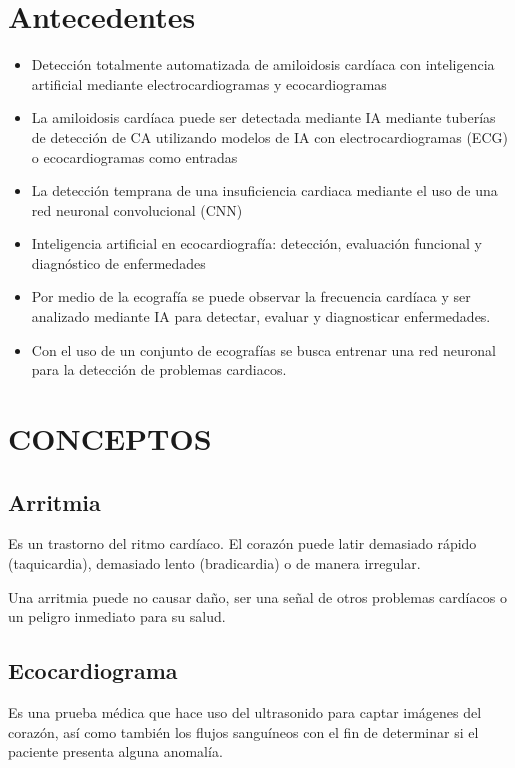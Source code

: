 \documentclass[conference]{IEEEtran}
\begin{document}
\section{Antecedentes}

\begin{itemize}

\item Detección totalmente automatizada de amiloidosis cardíaca con inteligencia artificial mediante electrocardiogramas y ecocardiogramas
\item La amiloidosis cardíaca puede ser detectada mediante IA mediante tuberías de detección de CA utilizando modelos de IA con electrocardiogramas (ECG) o ecocardiogramas como entradas
\item La detección temprana de una insuficiencia cardiaca mediante el uso de una red neuronal convolucional (CNN)
\item Inteligencia artificial en ecocardiografía: detección, evaluación funcional y diagnóstico de enfermedades
\item Por medio de la ecografía se puede observar la frecuencia cardíaca y ser analizado mediante IA para detectar, evaluar y diagnosticar enfermedades.
\item Con el uso de un conjunto de ecografías se busca entrenar una red neuronal para la detección de problemas cardiacos.

\end{itemize}

\section{CONCEPTOS}


\subsection{Arritmia}\label{AA}
Es un trastorno del ritmo cardíaco. El corazón puede latir demasiado rápido (taquicardia), demasiado lento (bradicardia) o de manera irregular.

Una arritmia puede no causar daño, ser una señal de otros problemas cardíacos o un peligro inmediato para su salud.


\subsection{Ecocardiograma}
Es una prueba médica que hace uso del ultrasonido para captar imágenes del corazón, así como también los flujos sanguíneos con el fin de determinar si el paciente presenta alguna anomalía.
\end{document}
